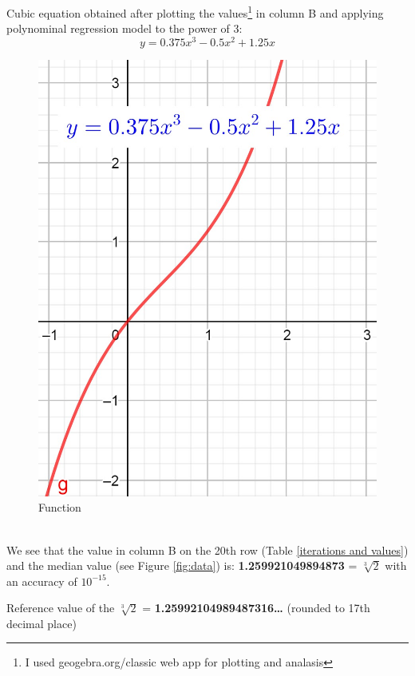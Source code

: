 \documentclass[12pt, letterpaper, oneside]{report}
\begin{document}
Cubic equation obtained after plotting the values\footnote{I used geogebra.org/classic web app for plotting and analasis } in column B and applying polynominal regression model to the power of 3:
\begin{equation}
y=0.375x^{3}-0.5x^{2}+1.25x
\end{equation}
\begin{figure}[h]
	\centering
	\includegraphics[width=0.2\linewidth]{images/g_x_func.jpg}
	\caption{Function}
	\label{fig:function}
\end{figure}\\
\newpage
We see that the value in column B on the 20th row (Table   \ref{iterations and values}) and the median value (see Figure \ref{fig:data}) is:  \textbf{1.259921049894873} = $\sqrt[3]{2}$ with an accuracy of $10^{-15}$.
\vspace{10pt}
\\
\begin{center}
	Reference value of the $\sqrt[3]{2}$ = \textbf{1.25992104989487316…} (rounded to 17th decimal place)
\end{center}
\vspace{10pt}


\end{document}
